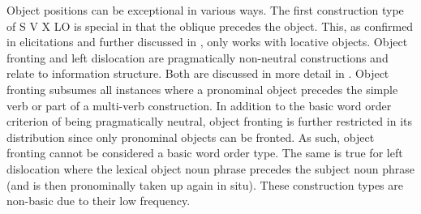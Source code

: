 Object positions can be exceptional in various ways. The first construction type of S V X LO is special in that the oblique precedes the object. This, as confirmed in elicitations and further discussed in , only works with locative objects. Object fronting and left dislocation are pragmatically non-neutral constructions and relate to information structure. Both are discussed in more detail in . Object fronting subsumes all instances where a pronominal object precedes the simple verb or part of a multi-verb construction. In addition to the basic word order criterion of being pragmatically neutral, object fronting is further restricted in its distribution since only pronominal objects can be fronted. As such, object fronting cannot be considered a basic word order type. The same is true for left dislocation where the lexical object noun phrase precedes the subject noun phrase (and is then pronominally taken up again in situ). These construction types are non-basic due to their low frequency.



